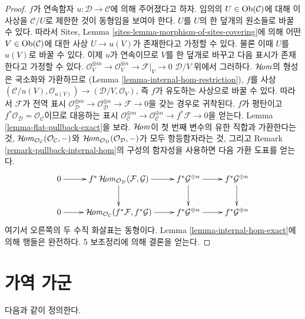 \begin{proof}
$f$가 연속함자 $u : \mathcal{D} \to \mathcal{C}$에 의해 주어졌다고 하자.
임의의 $U \in \mathop{\mathrm{Ob}}\nolimits(\mathcal{C})$에 대해 이 사상을 $\mathcal{C}/U$로
제한한 것이 동형임을 보여야 한다. $U$를 $U$의 한 덮개의 원소들로 바꿀 수
있다. 따라서 Sites, Lemma \ref{sites-lemma-morphism-of-sites-covering}에 의해
어떤 $V \in \mathop{\mathrm{Ob}}\nolimits(\mathcal{C})$에 대한 사상 $U \to u(V)$가 존재한다고 가정할
수 있다. 물론 이때 $U$를 $u(V)$로 바꿀 수 있다. 이제 $u$가 연속이므로
$V$를 한 덮개로 바꾸고 다음 표시가 존재한다고 가정할 수 있다.
$\mathcal{O}_V^{\oplus m} \to \mathcal{O}_V^{\oplus n} \to
\mathcal{F}|_V \to 0$
$\mathcal{D}/V$ 위에서 그러하다. $\mathop{\mathcal{H}\!\mathit{om}}\nolimits$의 형성은 국소화와 가환하므로
(Lemma \ref{lemma-internal-hom-restriction}), $f$를 사상
$(\mathcal{C}/u(V), \mathcal{O}_{u(V)}) \to
(\mathcal{D}/V, \mathcal{O}_V)$, 즉 $f$가 유도하는 사상으로 바꿀 수 있다.
따라서 $\mathcal{F}$가 전역 표시
$\mathcal{O}_\mathcal{D}^{\oplus m} \to \mathcal{O}_\mathcal{D}^{\oplus n} \to
\mathcal{F} \to 0$을 갖는 경우로 귀착된다. $f$가 평탄이고
$f^*\mathcal{O}_\mathcal{D} = \mathcal{O}_\mathcal{C}$이므로 대응하는 표시
$\mathcal{O}_\mathcal{C}^{\oplus m} \to \mathcal{O}_\mathcal{C}^{\oplus n} \to
f^*\mathcal{F} \to 0$을 얻는다. Lemma \ref{lemma-flat-pullback-exact}을 보라.
$\mathop{\mathcal{H}\!\mathit{om}}\nolimits$이 첫 번째 변수의 유한 직합과 가환한다는 것,
$\mathop{\mathcal{H}\!\mathit{om}}\nolimits_{\mathcal{O}_\mathcal{C}}(\mathcal{O}_\mathcal{C}, -)$와
$\mathop{\mathcal{H}\!\mathit{om}}\nolimits_{\mathcal{O}_\mathcal{D}}(\mathcal{O}_\mathcal{D}, -)$가 모두
항등함자라는 것, 그리고 Remark \ref{remark-pullback-internal-hom}의 구성의
함자성을 사용하면 다음 가환 도표를 얻는다.
$$
\xymatrix{
0 \ar[r] &
f^*\SheafHom_{\mathcal{O}_\mathcal{D}}(\mathcal{F}, \mathcal{G})
\ar[d] \ar[r] &
f^*\mathcal{G}^{\oplus n} \ar[d] \ar[r] &
f^*\mathcal{G}^{\oplus n} \ar[d] \\
0 \ar[r] &
\SheafHom_{\mathcal{O}_\mathcal{C}}(f^*\mathcal{F}, f^*\mathcal{G})
\ar[r] &
f^*\mathcal{G}^{\oplus n} \ar[r] &
f^*\mathcal{G}^{\oplus n}
}
$$
여기서 오른쪽의 두 수직 화살표는 동형이다. Lemma
\ref{lemma-internal-hom-exact}에 의해 행들은 완전하다. 5 보조정리에 의해
결론을 얻는다.
\end{proof}







\section{가역 가군}
\label{section-invertible}

\noindent
다음과 같이 정의한다.

